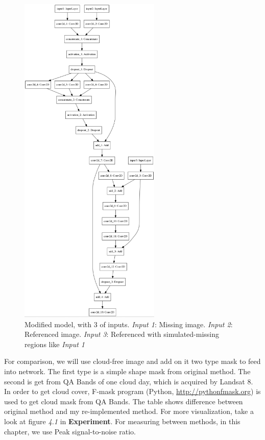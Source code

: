 \begin{figure}[h!tb]
	\clearpage{}
	\centering
	\includegraphics[width=0.6\textwidth]{figures/modifiedModel.png}
	\caption{Modified model, with 3 of inputs. \textit{Input 1}: Missing image. \textit{Input 2}: Referenced image. \textit{Input 3}: Referenced with simulated-missing regions like \textit{Input 1}}
	\label{fig:modifiedModel}
\end{figure}	

For comparison, we will use cloud-free image and add on it two type mask to feed into network. The first type is a simple shape mask from original method. The second is get from QA Bands of one cloud day, which is acquired by Landsat 8. In order to get cloud cover, F-mask program (Python, \href{http://pythonfmask.org}{http://pythonfmask.org}) is used to get cloud mask from QA Bands. The table shows difference between original method and my re-implemented method. For more visualization, take a look at figure \textit{4.1} in \textbf{Experiment}. For measuring between methods, in this chapter, we use Peak signal-to-noise ratio.


